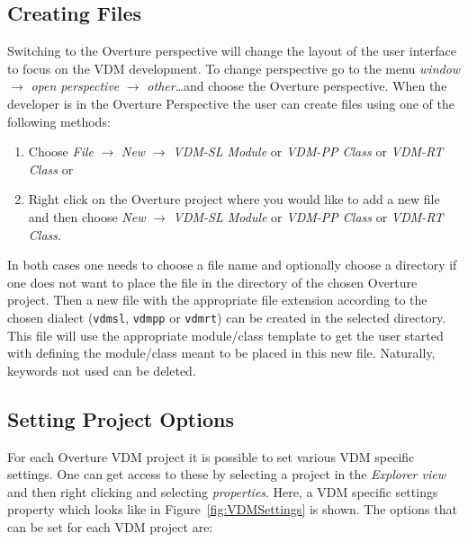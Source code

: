 \documentclass{overturerep}
\begin{document}
{%

\subsection{Creating Files}

Switching to the Overture perspective will change the layout of the user
interface to focus on the VDM development. To change perspective go to the menu 
\emph{window} $\rightarrow$ \emph{open perspective} $\rightarrow$ \emph{other}\ldots and choose the
Overture perspective.
When the developer is in the Overture Perspective the user can create files
using one of the following methods:

\begin{enumerate}
  \item Choose \emph{File} $\rightarrow$ \emph{New} $\rightarrow$
    \emph{VDM-SL Module} or 
    \emph{VDM-PP Class} or 
    \emph{VDM-RT Class} or
  \item Right click on the Overture project where you would like to
    add a new file and then choose \emph{New} $\rightarrow$ 
    \emph{VDM-SL Module} or \emph{VDM-PP Class} or \emph{VDM-RT Class}.
\end{enumerate}

In both cases one needs to choose a file name and optionally choose a
directory if one does not want to place the file in the directory of
the chosen Overture project. Then a new file with the appropriate file
extension according to the chosen dialect (\texttt{vdmsl},
\texttt{vdmpp} or \texttt{vdmrt}) can be
created in the selected directory. This file will use the appropriate
module/class template to get the user started with defining the
module/class meant to be placed in this new file. Naturally, keywords 
not used can be deleted.

\subsection{Setting Project Options}\label{subsec:options}

For each Overture VDM project it is possible to set various VDM
specific settings. One can get access to these by selecting a project
in the \emph{Explorer view} and then right clicking and selecting
\emph{properties}. Here, a VDM specific settings property which
looks like in Figure~\ref{fig:VDMSettings} is shown. The options 
that can be set for each VDM project are:

}
\end{document}
